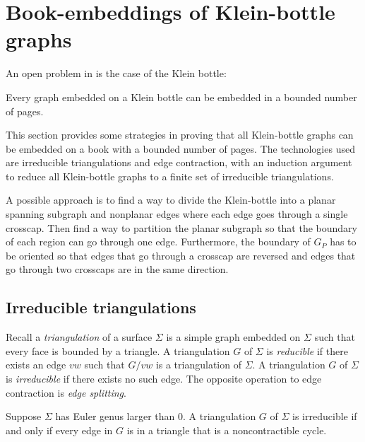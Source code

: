 \section{Book-embeddings of Klein-bottle graphs}\label{sec:kleinbottle}
An open problem in \textcite{ozekiBookEmbeddingGraphs2019} is the case of the Klein bottle:
\begin{conjecture}\label{conj:klein_bottle}
    Every graph embedded on a Klein bottle can be embedded in a bounded number of pages.
\end{conjecture}

This section provides some strategies in proving that all Klein-bottle graphs can be embedded on a book with a bounded number of pages. The technologies used are irreducible triangulations and edge contraction, with an induction argument to reduce all Klein-bottle graphs to a finite set of irreducible triangulations.

A possible approach is to find a way to divide the Klein-bottle into a planar spanning subgraph and nonplanar edges where each edge goes through a single crosscap. Then find a way to partition the planar subgraph so that the boundary of each region can go through one edge. Furthermore, the boundary of $G_P$ has to be oriented so that edges that go through a crosscap are reversed and edges that go through two crosscaps are in the same direction. 

\subsection{Irreducible triangulations}
Recall a \textit{triangulation} of a surface $\Sigma$ is a simple graph embedded on $\Sigma$ such that every face is bounded by a triangle. A triangulation $G$ of $\Sigma$ is \textit{reducible} if there exists an edge $vw$ such that $G / vw$ is a triangulation of $\Sigma$. A triangulation $G$ of $\Sigma$ is \textit{irreducible} if there exists no such edge. The opposite operation to edge contraction is \textit{edge splitting}. 

\begin{proposition}
    Suppose $\Sigma$ has Euler genus larger than $0$. A triangulation $G$ of $\Sigma$ is irreducible if and only if every edge in $G$ is in a triangle that is a noncontractible cycle.
\end{proposition}

